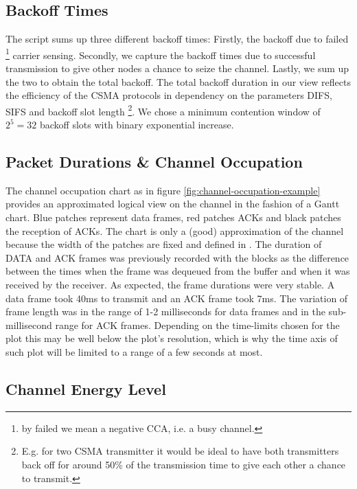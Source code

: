 \subsection{Backoff Times}

The script  sums up three different backoff times: Firstly, the backoff due to failed \footnote{by failed we mean a negative CCA, i.e. a busy channel.} carrier sensing. Secondly, we capture the backoff times due to successful transmission to give other nodes a chance to seize the channel. Lastly, we sum up the two to obtain the total backoff. The total backoff duration in our view reflects the efficiency of the CSMA protocols in dependency on the parameters DIFS, SIFS and backoff slot length \footnote{E.g. for two CSMA transmitter it would be ideal to have both transmitters back off for around 50\% of the transmission time to give each other a chance to transmit.}. We chose a minimum contention window of $2^5=32$ backoff slots with binary exponential increase. 

\subsection{Packet Durations \& Channel Occupation}

The channel occupation chart as in figure \ref{fig:channel-occupation-example} provides an approximated logical view on the channel in the fashion of a Gantt chart. Blue patches represent data frames, red patches ACKs and black patches the reception of ACKs. The chart is only a (good) approximation of the channel because the width of the patches are fixed and defined in . The duration of DATA and ACK frames was previously recorded with the  blocks as the difference between the times when the frame was dequeued from the buffer and when it was received by the receiver. As expected, the frame durations were very stable. A data frame took 40ms to transmit and an ACK frame took 7ms. The variation of frame length was in the range of 1-2  milliseconds for data frames and in the sub-millisecond range for ACK frames. Depending on the time-limits chosen for the plot this may be well below the plot's resolution, which is why the time axis of such plot will be limited to a range of a few seconds at most.

\subsection{Channel Energy Level}


